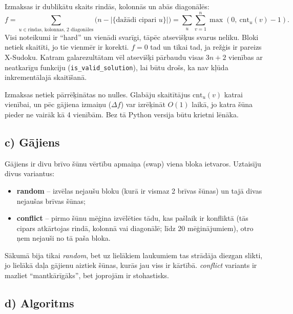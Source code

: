 \documentclass[11pt,a4paper]{article}
\begin{document}
Izmaksas ir dublikātu skaits rindās, kolonnās un abās diagonālēs:
\[
f = \sum_{u \in \text{rindas, kolonnas, 2 diagonāles}} \big(n - |\{\text{dažādi cipari } u\}|\big)
  = \sum_{u}\sum_{v=1}^{n} \max(0,\ \text{cnt}_u(v) - 1).
\]
Visi noteikumi ir ``hard'' un vienādi svarīgi, tāpēc atsevišķus svarus neliku. Bloki netiek skaitīti,
jo tie vienmēr ir korekti. $f=0$ tad un tikai tad, ja režģis ir pareizs X-Sudoku. Katram galarezultātam
vēl atsevišķi pārbaudu visas $3n+2$ vienības ar neatkarīgu funkciju (\texttt{is\_valid\_solution}),
lai būtu drošs, ka nav kļūda inkrementālajā skaitīšanā.

Izmaksas netiek pārrēķinātas no nulles. Glabāju skaitītājus $\text{cnt}_u(v)$ katrai vienībai, un pēc
gājiena izmaiņu ($\Delta f$) var izrēķināt $O(1)$ laikā, jo katra šūna pieder ne vairāk kā 4 vienībām.
Bez tā Python versija būtu krietni lēnāka.

\subsection*{c) Gājiens}

Gājiens ir divu brīvo šūnu vērtību apmaiņa (swap) viena bloka ietvaros. Uztaisīju divus variantus:
\begin{itemize}
  \item \textbf{random} -- izvēlas nejaušu bloku (kurā ir vismaz 2 brīvas šūnas) un tajā divas nejaušas brīvas šūnas;
  \item \textbf{conflict} -- pirmo šūnu mēģina izvēlēties tādu, kas pašlaik ir konfliktā (tās cipars
        atkārtojas rindā, kolonnā vai diagonālē; līdz 20 mēģinājumiem), otro ņem nejauši no tā paša bloka.
\end{itemize}
Sākumā bija tikai \textit{random}, bet uz lielākiem laukumiem tas strādāja diezgan slikti, jo lielākā daļa
gājienu aiztiek šūnas, kurās jau viss ir kārtībā. \textit{conflict} variants ir mazliet ``mantkārīgāks'',
bet joprojām ir stohastisks.

\subsection*{d) Algoritms}
\end{document}

